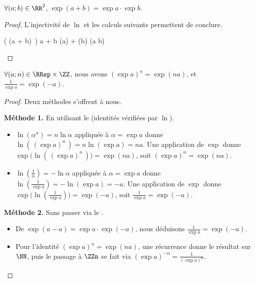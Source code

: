 \begin{fact}
	$\forall (a;b) \in \RR^2$,
	$\exp(a + b) = \exp a \cdot \exp b$.
\end{fact}


\begin{proof}
	L'injectivité de $\ln$ et les calculs suivants permettent de conclure.
	
	\begin{stepcalc}[style=ar*]
		\ln \big( \exp(a + b) \,\big)
		a + b
		\ln(\exp a) + \ln(\exp b)
		\ln(\exp a \cdot \exp b)
	\end{stepcalc}

	\null
	\vspace{-4ex}
\end{proof}




\begin{fact} \label{exp-id}
	$\forall (a;n) \in \RRsp \times \ZZ$,
	nous avons
	$(\exp a)^n = \exp(n a)$,
	et
	$\frac{1}{\exp a} = \exp(- a)$.
\end{fact}


\begin{proof}
	Deux méthodes s'offrent à nous.
	
	\smallskip
	\textbf{Méthode 1.} En utilisant le  (identités vérifiées par $\ln$).
	\begin{itemize}
		\item $\ln(\alpha^n) = n \ln \alpha$ appliquée à $\alpha = \exp a$ donne
		$\ln(\,(\exp a)^n\,) = n \ln(\exp a) = n a$.
		Une application de $\exp$ donne
		$\exp\big( \ln(\,(\exp a)^n\,) \big) = \exp(n a)$,
		soit
		$(\exp a)^n = \exp(n a)$.


		\item $\ln(\frac{1}{\alpha}) = - \ln \alpha$ appliquée à $\alpha = \exp a$ donne
		$\ln(\frac{1}{\exp a}) = - \ln(\exp a) = - a$.
		Une application de $\exp$ donne
		$\exp\big( \ln(\frac{1}{\exp a}) \big) = \exp(- a)$,
		soit
		$\frac{1}{\exp a} = \exp(- a)$.		
	\end{itemize}

	
	\smallskip
	\textbf{Méthode 2.} Sans passer via le \reffact{ln-id}.
	\begin{itemize}
		\item De $\exp(a - a) = \exp a \cdot \exp(- a)$, nous déduisons $\frac{1}{\exp a} = \exp(- a)$.


		\item Pour l'identité $(\exp a)^n = \exp(n a)$, une récurrence donne le résultat sur $\NN$, puis le passage à $\ZZn$ se fait via $(\exp a)^{-n} = \frac{1}{(\exp a)^n}$.
	\end{itemize}
	
	\null
	\vspace{-5ex}
\end{proof}